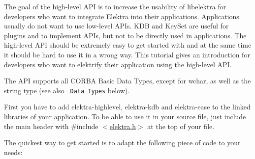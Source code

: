 The goal of the high-\/level A\+PI is to increase the usability of libelektra for developers who want to integrate Elektra into their applications. Applications usually do not want to use low-\/level A\+P\+Is. {\ttfamily K\+DB} and {\ttfamily Key\+Set} are useful for plugins and to implement A\+P\+Is, but not to be directly used in applications. The high-\/level A\+PI should be extremely easy to get started with and at the same time it should be hard to use it in a wrong way. This tutorial gives an introduction for developers who want to elektrify their application using the high-\/level A\+PI.

The A\+PI supports all C\+O\+R\+BA Basic Data Types, except for {\ttfamily wchar}, as well as the {\ttfamily string} type (see also \href{\#data-types}{\texttt{ Data Types}} below).

First you have to add {\ttfamily elektra-\/highlevel}, {\ttfamily elektra-\/kdb} and {\ttfamily elektra-\/ease} to the linked libraries of your application. To be able to use it in your source file, just include the main header with {\ttfamily \#include $<$\mbox{\hyperlink{elektra_8h}{elektra.\+h}}$>$} at the top of your file.

The quickest way to get started is to adapt the following piece of code to your needs\+:


\begin{DoxyCode}{0}
\DoxyCodeLine{\{}
\DoxyCodeLine{\}}
\DoxyCodeLine{}
\DoxyCodeLine{}
\DoxyCodeLine{\{}
\DoxyCodeLine{\}}
\DoxyCodeLine{}
\end{DoxyCode}


